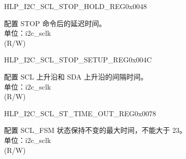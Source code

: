 \begin{register}{H}{LP\_I2C\_SCL\_STOP\_HOLD\_REG}{0x0048}\label{regdesc:LPI2CSCLSTOPHOLDREG}
%
%
\regnewline%
\begin{regdesc}\begin{reglist}
\label{fielddesc:LPI2CSCLSTOPHOLDTIME}\item [LP\_I2C\_SCL\_STOP\_HOLD\_TIME] 配置 STOP 命令后的延迟时间。\\
单位：i2c\_sclk \\ (R/W)
\end{reglist}\end{regdesc}
\end{register}


\begin{register}{H}{LP\_I2C\_SCL\_STOP\_SETUP\_REG}{0x004C}\label{regdesc:LPI2CSCLSTOPSETUPREG}
%
%
\regnewline%
\begin{regdesc}\begin{reglist}
\label{fielddesc:LPI2CSCLSTOPSETUPTIME}\item [LP\_I2C\_SCL\_STOP\_SETUP\_TIME] 配置 SCL 上升沿和 SDA 上升沿的间隔时间。\\
单位：i2c\_sclk \\ (R/W)
\end{reglist}\end{regdesc}
\end{register}


\begin{register}{H}{LP\_I2C\_SCL\_ST\_TIME\_OUT\_REG}{0x0078}\label{regdesc:LPI2CSCLSTTIMEOUTREG}
%
%
\regnewline%
\begin{regdesc}\begin{reglist}
\label{fielddesc:LPI2CSCLSTTOI2C}\item [LP\_I2C\_SCL\_ST\_TO\_I2C] 配置 SCL\_FSM 状态保持不变的最大时间，不能大于 23。\\
单位：i2c\_sclk \\ (R/W)
\end{reglist}\end{regdesc}
\end{register}


